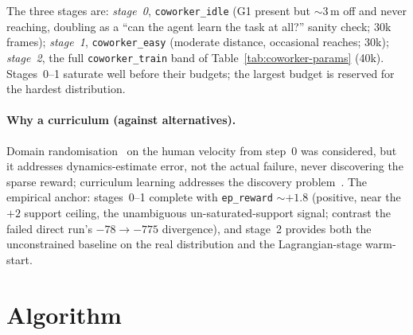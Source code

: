 \documentclass[11pt,a4paper]{report}
\begin{document}
\label{tab:curriculum-stages}%
The three stages are: \emph{stage~0}, \texttt{coworker\_idle} (G1
present but $\sim$3\,m off and never reaching, doubling as a
``can the agent learn the task at all?'' sanity check; 30k frames);
\emph{stage~1}, \texttt{coworker\_easy} (moderate distance,
occasional reaches; 30k); \emph{stage~2}, the full
\texttt{coworker\_train} band of Table~\ref{tab:coworker-params}
(40k). Stages~0--1 saturate well before their budgets; the largest
budget is reserved for the hardest distribution.

\paragraph{Why a curriculum (against alternatives).}
Domain randomisation~\cite{tobin2017domainrand} on the human
velocity from step~0 was considered, but it addresses
dynamics-estimate error, not the actual failure, never discovering
the sparse reward; curriculum learning addresses the discovery
problem~\cite{narvekar2020curriculum,openai2019solving}. The
empirical anchor: stages~0--1 complete with \texttt{ep\_reward}
$\sim{+}1.8$ (positive, near the $+2$ support ceiling, the
unambiguous un-saturated-support signal; contrast the failed direct
run's $-78 \to -775$ divergence), and stage~2 provides both the
unconstrained baseline on the real distribution and the
Lagrangian-stage warm-start.


\section{Algorithm}
\label{sec:method:algorithm}
\end{document}
